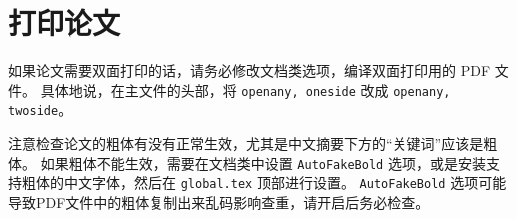 \section{打印论文}

如果论文需要双面打印的话，请务必修改文档类选项，编译双面打印用的 PDF 文件。
具体地说，在主文件的头部，将 \texttt{openany, oneside} 改成 \texttt{openany, twoside}。

注意检查论文的粗体有没有正常生效，尤其是中文摘要下方的“关键词”应该是粗体。
如果粗体不能生效，需要在文档类中设置 \verb|AutoFakeBold| 选项，或是安装支持粗体的中文字体，然后在 \verb|global.tex| 顶部进行设置。
\verb|AutoFakeBold| 选项可能导致PDF文件中的粗体复制出来乱码影响查重，请开启后务必检查。
